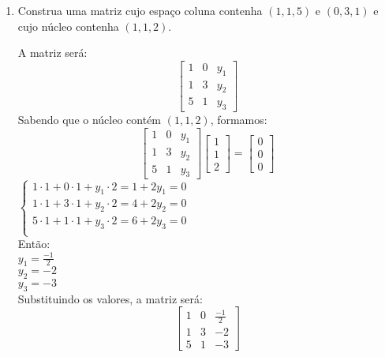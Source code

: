 \documentclass[leqno]{article}
\numberwithin{equation}{section}
\begin{document}
\begin{enumerate}
		\item Construa uma matriz cujo espaço coluna contenha $(1,1,5)$ e $(0,3,1)$ e cujo núcleo contenha $(1,1,2)$.
		
		\begin{sol} 
			A matriz será:$$\begin{bmatrix} 
				1 & 0 & y_1\\
				1 & 3 & y_2\\
				5 & 1 & y_3
			\end{bmatrix} $$ 
		Sabendo que o núcleo contém $(1,1,2)$, formamos:\\
		\newline
		$$\begin{bmatrix} 
			1 & 0 & y_1\\
			1 & 3 & y_2\\
			5 & 1 & y_3
		\end{bmatrix}\begin{bmatrix} 
		1\\
		1\\
		2
		\end{bmatrix} = \begin{bmatrix} 
		0\\
		0\\
		0
		\end{bmatrix}$$
		\newline
		$
		\left\{
		\begin {array}{cl}
		1 \cdot 1 + 0 \cdot 1 + y_1 \cdot 2 = 1 + 2y_1 = 0\\
		1 \cdot 1 + 3 \cdot 1 + y_2 \cdot 2 = 4 + 2y_2 = 0\\
		5 \cdot 1 + 1 \cdot 1 + y_3 \cdot 2 = 6 + 2y_3 = 0\\
		\end{array}
		\right.$\\
		\newline
		Então:\\
		$y_1 = \frac{-1}{2}$\\
		$y_2 = -2$\\
		$y_3 = -3$\\
		\newline
		Substituindo os valores, a matriz será: $$\begin{bmatrix} 
			1 & 0 & \frac{-1}{2}\\
			1 & 3 & -2\\
			5 & 1 & -3
		\end{bmatrix} $$\\
		\end{sol} 
		

\end{enumerate}
\end{document}
